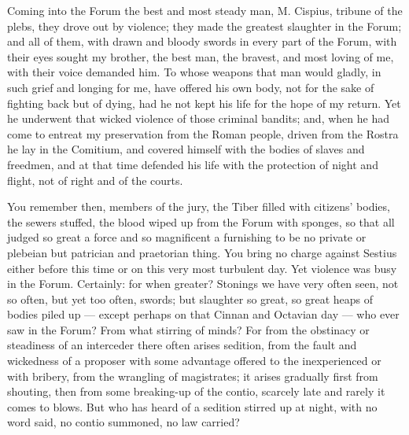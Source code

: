  Coming into the Forum the best and most steady man, M. Cispius, tribune of the plebs, they drove out by violence; they made the greatest slaughter in the Forum; and all of them, with drawn and bloody swords in every part of the Forum, with their eyes sought my brother, the best man, the bravest, and most loving of me, with their voice demanded him. To whose weapons that man would gladly, in such grief and longing for me, have offered his own body, not for the sake of fighting back but of dying, had he not kept his life for the hope of my return. Yet he underwent that wicked violence of those criminal bandits; and, when he had come to entreat my preservation from the Roman people, driven from the Rostra he lay in the Comitium, and covered himself with the bodies of slaves and freedmen, and at that time defended his life with the protection of night and flight, not of right and of the courts.

 You remember then, members of the jury, the Tiber filled with citizens' bodies, the sewers stuffed, the blood wiped up from the Forum with sponges, so that all judged so great a force and so magnificent a furnishing to be no private or plebeian but patrician and praetorian thing. You bring no charge against Sestius either before this time or on this very most turbulent day. Yet violence was busy in the Forum. Certainly: for when greater? Stonings we have very often seen, not so often, but yet too often, swords; but slaughter so great, so great heaps of bodies piled up --- except perhaps on that Cinnan and Octavian day --- who ever saw in the Forum? From what stirring of minds? For from the obstinacy or steadiness of an interceder there often arises sedition, from the fault and wickedness of a proposer with some advantage offered to the inexperienced or with bribery, from the wrangling of magistrates; it arises gradually first from shouting, then from some breaking-up of the contio, scarcely late and rarely it comes to blows. But who has heard of a sedition stirred up at night, with no word said, no contio summoned, no law carried?

